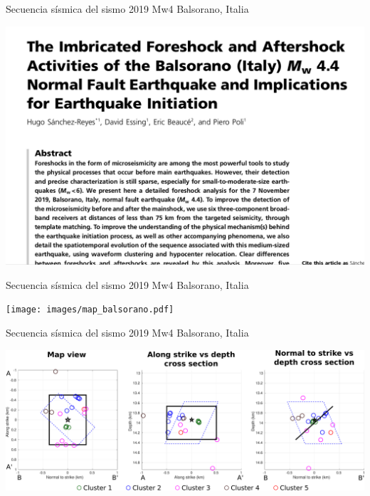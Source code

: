 \documentclass{beamer}
\begin{document}
\begin{frame}
 {Secuencia s\'ismica del sismo 2019 Mw4 Balsorano, Italia}

 \begin{minipage}{1\linewidth}
  \centering \includegraphics[width=0.8\linewidth,angle=15]{images/paper.png}
 \end{minipage} 
 
\end{frame}



\begin{frame}
 {Secuencia s\'ismica del sismo 2019 Mw4 Balsorano, Italia}

 \begin{minipage}{1\linewidth}
  \centering \texttt{[image: images/map\_balsorano.pdf]}
 \end{minipage} 
 
\end{frame}


\begin{frame}
 {Secuencia s\'ismica del sismo 2019 Mw4 Balsorano, Italia}

 \begin{minipage}{1\linewidth}
  \centering \includegraphics[width=1\linewidth]{images/S6_templates_per_cluster_map.pdf}
 \end{minipage} 
 
\end{frame}
\end{document}
